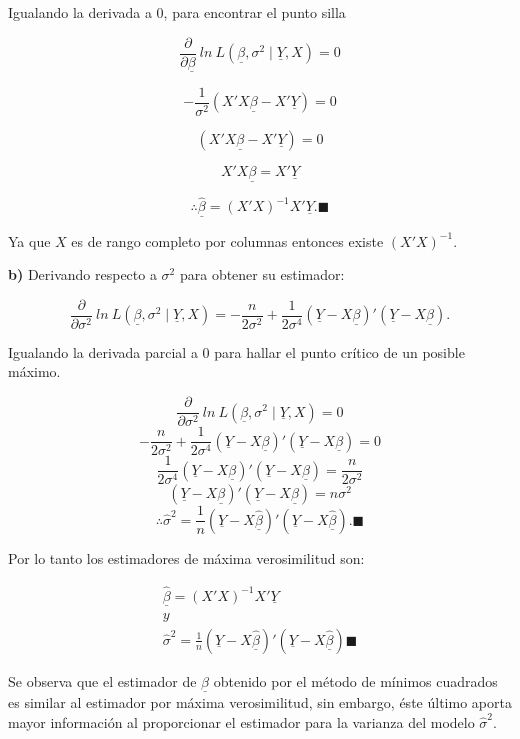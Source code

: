 \documentclass[
  a4paper,
  oneside,
  openany]{book}
\begin{document}
Igualando la derivada a 0, para encontrar el punto silla

\[\frac{\partial}{\partial \underline{\beta}} \ ln \ L(\underline{\beta},\sigma^2 \mid \underline{Y},X)=0\]

\[-\frac{1}{\sigma^2}(X'X\underline{\beta}-X'\underline{Y})=0\]

\[(X'X\underline{\beta}-X'\underline{Y})=0\]

\[X'X\underline{\beta}=X'\underline{Y}\]

\[\therefore \underline{\hat{\beta}}=(X'X)^{-1}X'\underline{Y}. \blacksquare\]

Ya que \(X\) es de rango completo por columnas entonces existe \((X'X)^{-1}.\)

\textbf{b)} Derivando respecto a \(\sigma^2\) para obtener su estimador:

\[\frac{\partial}{\partial\sigma^2} \ ln \ L(\underline{\beta},\sigma^2 \mid \underline{Y},X)=-\frac{n}{2\sigma^2}+\frac{1}{2\sigma^4}(\underline{Y}-X\underline{\beta})'(\underline{Y}-X\underline{\beta}).\]

Igualando la derivada parcial a 0 para hallar el punto crítico de un posible máximo.

\[\frac{\partial}{\partial\sigma^2} \ ln \ L(\underline{\beta}, \sigma^2 \mid \underline{Y},X)=0\]
\[-\frac{n}{2\sigma^2}+\frac{1}{2\sigma^4}(\underline{Y}-X\underline{\beta})'(\underline{Y}-X\underline{\beta})=0\]
\[\frac{1}{2\sigma^4}(\underline{Y}-X\underline{\beta})'(\underline{Y}-X\underline{\beta})=\frac{n}{2\sigma^2}\]
\[(\underline{Y}-X\underline{\beta})'(\underline{Y}-X\underline{\beta})=n\sigma^2\]
\[\therefore \hat{\sigma}^2=\frac{1}{n}\left( \underline{Y}-X\underline{\hat{\beta}}\right)'\left(\underline{Y}-X \underline{\hat{\beta}}\right).\blacksquare\]

Por lo tanto los estimadores de máxima verosimilitud son:

\[
\begin{array}{c}
\underline{\hat{\beta}}=(X'X)^{-1}X'\underline{Y} \\
y \\
\hat{\sigma}^2=\frac{1}{n}\left( \underline{Y}-X\underline{\hat{\beta}}\right)'\left(\underline{Y}-X \underline{\hat{\beta}}\right) \blacksquare
\end{array}
\]

Se observa que el estimador de \(\underline{\beta}\) obtenido por el método de mínimos cuadrados es similar al estimador por máxima verosimilitud, sin embargo, éste último aporta mayor información al proporcionar el estimador para la varianza del modelo \(\hat{\sigma}^2.\)
\end{document}
